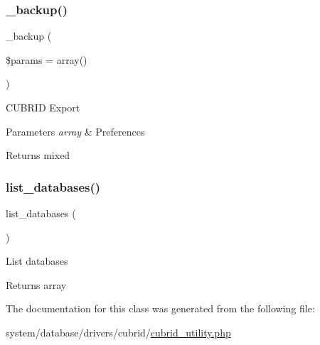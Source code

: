 \subsubsection{\texorpdfstring{\+\_\+backup()}{\_backup()}}
{\footnotesize\ttfamily \+\_\+backup (\begin{DoxyParamCaption}\item[{}]{\$params = {\ttfamily array()} }\end{DoxyParamCaption})\hspace{0.3cm}{\ttfamily [protected]}}

C\+U\+B\+R\+ID Export


\begin{DoxyParams}{Parameters}
{\em array} & Preferences \\
\hline
\end{DoxyParams}
\begin{DoxyReturn}{Returns}
mixed 
\end{DoxyReturn}
\mbox{\label{class_c_i___d_b__cubrid__utility_a8486b247a8868504b055622cb2dd34d3}} 
\subsubsection{\texorpdfstring{list\+\_\+databases()}{list\_databases()}}
{\footnotesize\ttfamily list\+\_\+databases (\begin{DoxyParamCaption}{ }\end{DoxyParamCaption})}

List databases

\begin{DoxyReturn}{Returns}
array 
\end{DoxyReturn}


The documentation for this class was generated from the following file\+:\begin{DoxyCompactItemize}
\item 
system/database/drivers/cubrid/\mbox{\hyperlink{cubrid__utility_8php}{cubrid\+\_\+utility.\+php}}\end{DoxyCompactItemize}
